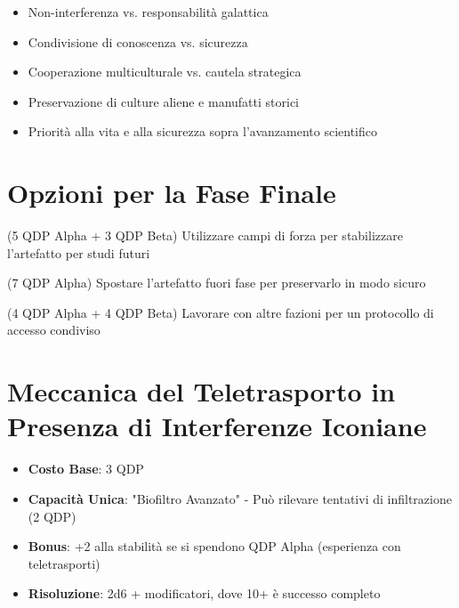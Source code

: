 \documentclass[11pt,a4paper]{article}
\begin{document}
\begin{tcolorbox}[colback=fedlightblue!10, colframe=fedblue]
\begin{itemize}[leftmargin=*]
\item Non-interferenza vs. responsabilità galattica
\item Condivisione di conoscenza vs. sicurezza
\item Cooperazione multiculturale vs. cautela strategica
\item Preservazione di culture aliene e manufatti storici
\item Priorità alla vita e alla sicurezza sopra l'avanzamento scientifico
\end{itemize}
\end{tcolorbox}

\section{Opzioni per la Fase Finale}

\begin{tcolorbox}[colback=fedlightblue!10, colframe=fedblue]
\begin{description}[leftmargin=*]
\item[Contenimento Scientifico] (5 QDP Alpha + 3 QDP Beta) Utilizzare campi di forza per stabilizzare l'artefatto per studi futuri
\item[Protocollo di Conservazione] (7 QDP Alpha) Spostare l'artefatto fuori fase per preservarlo in modo sicuro
\item[Integrazione Controllata] (4 QDP Alpha + 4 QDP Beta) Lavorare con altre fazioni per un protocollo di accesso condiviso
\end{description}
\end{tcolorbox}

\section{Meccanica del Teletrasporto in Presenza di Interferenze Iconiane}

\begin{tcolorbox}[colback=fedlightblue!10, colframe=fedblue]
\begin{itemize}[leftmargin=*]
\item \textbf{Costo Base}: 3 QDP 
\item \textbf{Capacità Unica}: "Biofiltro Avanzato" - Può rilevare tentativi di infiltrazione (2 QDP)
\item \textbf{Bonus}: +2 alla stabilità se si spendono QDP Alpha (esperienza con teletrasporti)
\item \textbf{Risoluzione}: 2d6 + modificatori, dove 10+ è successo completo
\end{itemize}
\end{tcolorbox}
\end{document}
